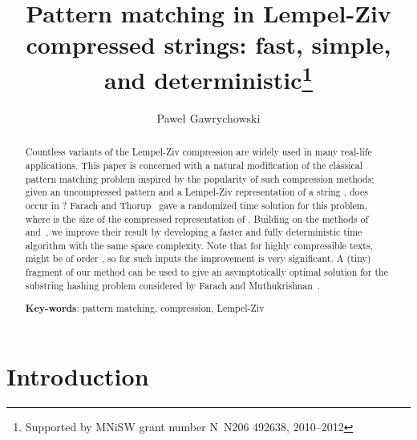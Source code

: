 \documentclass[runningheads]{llncs}
\begin{document}
\title{Pattern matching in Lempel-Ziv compressed strings: fast, simple, and deterministic\thanks{Supported by MNiSW grant number N~N206 492638, 2010--2012}}

\author{Pawe\l{} Gawrychowski}

\maketitle
\begin{abstract}
Countless variants of the Lempel-Ziv compression are widely used in many real-life applications. This paper is concerned with a natural modification of the classical pattern matching problem inspired by the popularity of such compression methods: given an uncompressed pattern  and a Lempel-Ziv representation of a string , does  occur in ? Farach and Thorup~\cite{Farach} gave a randomized  time solution for this problem, where  is the size of the compressed representation of . Building on the methods of~\cite{CharikarApproximation} and~\cite{GawrychowskiLZW}, we improve their result by developing a faster and fully deterministic  time algorithm with the same space complexity. Note that for highly compressible texts,  might be of order , so for such inputs the improvement is very significant. A (tiny) fragment of our method can be used to give an asymptotically optimal solution for the substring hashing problem considered by Farach and Muthukrishnan~\cite{FarachHashing}.

\textbf{Key-words}: pattern matching, compression, Lempel-Ziv
\end{abstract}

\section{Introduction}
\end{document}
